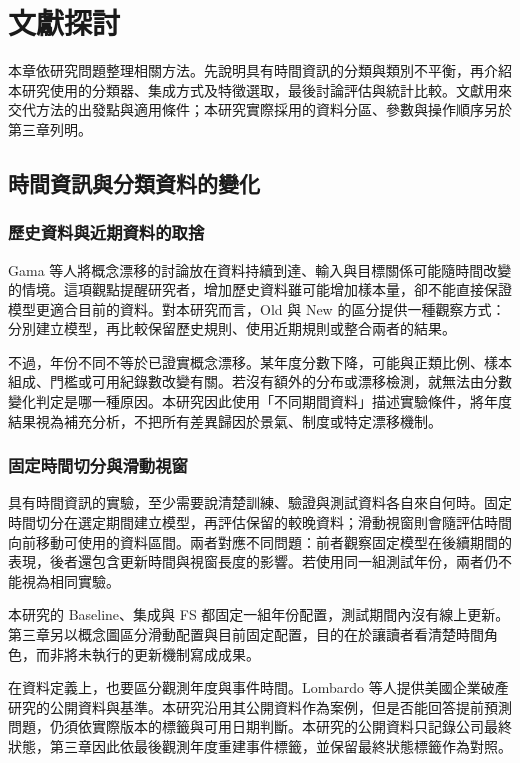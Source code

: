 \chapter{文獻探討}\label{chap:literature}
\begingroup
\setlength{\emergencystretch}{2em}

本章依研究問題整理相關方法。先說明具有時間資訊的分類與類別不平衡，再介紹本研究使用的分類器、集成方式及特徵選取，最後討論評估與統計比較。文獻用來交代方法的出發點與適用條件；本研究實際採用的資料分區、參數與操作順序另於第三章列明。

\section{時間資訊與分類資料的變化}

\subsection{歷史資料與近期資料的取捨}

Gama 等人\autocite{gama2014drift}將概念漂移的討論放在資料持續到達、輸入與目標關係可能隨時間改變的情境。這項觀點提醒研究者，增加歷史資料雖可能增加樣本量，卻不能直接保證模型更適合目前的資料。對本研究而言，Old 與 New 的區分提供一種觀察方式：分別建立模型，再比較保留歷史規則、使用近期規則或整合兩者的結果。

不過，年份不同不等於已證實概念漂移。某年度分數下降，可能與正類比例、樣本組成、門檻或可用紀錄數改變有關。若沒有額外的分布或漂移檢測，就無法由分數變化判定是哪一種原因。本研究因此使用「不同期間資料」描述實驗條件，將年度結果視為補充分析，不把所有差異歸因於景氣、制度或特定漂移機制。

\subsection{固定時間切分與滑動視窗}

具有時間資訊的實驗，至少需要說清楚訓練、驗證與測試資料各自來自何時。固定時間切分在選定期間建立模型，再評估保留的較晚資料；滑動視窗則會隨評估時間向前移動可使用的資料區間。兩者對應不同問題：前者觀察固定模型在後續期間的表現，後者還包含更新時間與視窗長度的影響。若使用同一組測試年份，兩者仍不能視為相同實驗。

本研究的 Baseline、集成與 FS 都固定一組年份配置，測試期間內沒有線上更新。第三章另以概念圖區分滑動配置與目前固定配置，目的在於讓讀者看清楚時間角色，而非將未執行的更新機制寫成成果。

在資料定義上，也要區分觀測年度與事件時間。Lombardo 等人\autocite{lombardo2022bankruptcy}提供美國企業破產研究的公開資料與基準。本研究沿用其公開資料作為案例，但是否能回答提前預測問題，仍須依實際版本的標籤與可用日期判斷。本研究的公開資料只記錄公司最終狀態，第三章因此依最後觀測年度重建事件標籤，並保留最終狀態標籤作為對照。

